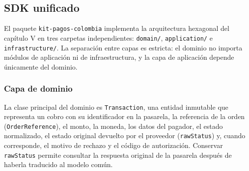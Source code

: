 \subsection{SDK unificado}

El paquete \texttt{kit-pagos-colombia} implementa la arquitectura hexagonal del capítulo V en tres carpetas independientes: \texttt{domain/}, \texttt{application/} e \texttt{infrastructure/}. La separación entre capas es estricta: el dominio no importa módulos de aplicación ni de infraestructura, y la capa de aplicación depende únicamente del dominio.

\subsubsection{Capa de dominio}

La clase principal del dominio es \texttt{Transaction}, una entidad inmutable que representa un cobro con su identificador en la pasarela, la referencia de la orden (\texttt{OrderReference}), el monto, la moneda, los datos del pagador, el estado normalizado, el estado original devuelto por el proveedor (\texttt{rawStatus}) y, cuando corresponde, el motivo de rechazo y el código de autorización. Conservar \texttt{rawStatus} permite consultar la respuesta original de la pasarela después de haberla traducido al modelo común.

